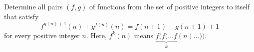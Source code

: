 Determine all pairs 
$(f,g)$
 of functions from the set of positive integers to itself that satisfy 
\[f^{g(n)+1}(n) + g^{f(n)}(n) = f(n+1) - g(n+1) + 1\]
 for every positive integer 
$n$.
 Here, 
$f^k(n)$
 means 
$\underbrace{f(f(\ldots f}_{k}(n) \ldots ))$.
